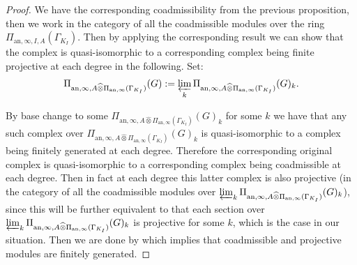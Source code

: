 \documentclass[12pt]{amsart}
\theoremstyle{definition}
\numberwithin{equation}{section}
\begin{document}
\begin{proof}
We have the corresponding coadmissibility from the previous proposition, then we work in the category of all the coadmissible modules over the ring $\Pi_{\mathrm{an},\infty,I,A}(\Gamma_{K_I})$. Then by applying the corresponding result \cite[Theorem 3.10]{Zab1} we can show that the complex is quasi-isomorphic to a corresponding complex being finite projective at each degree in the following. Set:
\begin{align}
\Pi_{\mathrm{an},\infty,A \widehat{\otimes} \Pi_{\mathrm{an},\infty}(\Gamma_{K_I})}(G):=\varprojlim_k \Pi_{\mathrm{an},\infty,A \widehat{\otimes} \Pi_{\mathrm{an},\infty}(\Gamma_{K_I})}(G)_k.	
\end{align}
 





By base change to some $\Pi_{\mathrm{an},\infty,A \widehat{\otimes} \Pi_{\mathrm{an},\infty}(\Gamma_{K_I})}(G)_k$ for some $k$ we have that any such complex over $ \Pi_{\mathrm{an},\infty,A \widehat{\otimes} \Pi_{\mathrm{an},\infty}(\Gamma_{K_I})}(G)_k$ is quasi-isomorphic to a complex being finitely generated at each degree. Therefore the corresponding original complex is quasi-isomorphic to a corresponding complex being coadmissible at each degree. Then in fact at each degree this latter complex is also projective (in the category of all the coadmissible modules over $\varprojlim_k \Pi_{\mathrm{an},\infty,A \widehat{\otimes} \Pi_{\mathrm{an},\infty}(\Gamma_{K_I})}(G)_k$), since this will be further equivalent to that each section over $\varprojlim_k \Pi_{\mathrm{an},\infty,A \widehat{\otimes} \Pi_{\mathrm{an},\infty}(\Gamma_{K_I})}(G)_k$ is projective for some $k$, which is the case in our situation. Then we are done by \cite[Theorem 3.10]{Zab1} which implies that coadmissible and projective modules are finitely generated.



\end{proof}
\end{document}
